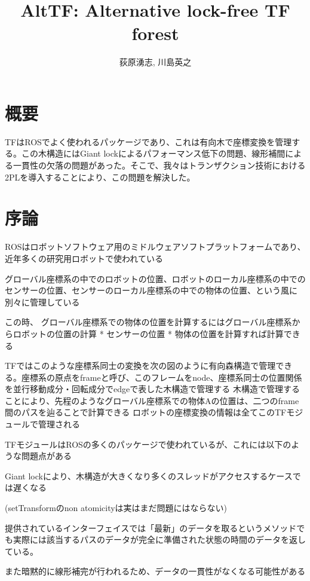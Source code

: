 \documentclass{article}
\title{AltTF: Alternative lock-free TF forest}
\author{荻原湧志, 川島英之}
\begin{document}
\begin{multicols}{2}

\maketitle

\section*{概要}
TFはROSでよく使われるパッケージであり、これは有向木で座標変換を管理する。この木構造にはGiant lockによるパフォーマンス低下の問題、線形補間による一貫性の欠落の問題があった。そこで、我々はトランザクション技術における2PLを導入することにより、この問題を解決した。

\section{序論}


ROSはロボットソフトウェア用のミドルウェアソフトプラットフォームであり、近年多くの研究用ロボットで使われている

グローバル座標系の中でのロボットの位置、ロボットのローカル座標系の中でのセンサーの位置、センサーのローカル座標系の中での物体の位置、という風に別々に管理している

この時、
グローバル座標系での物体の位置を計算するにはグローバル座標系からロボットの位置の計算 * センサーの位置 * 物体の位置を計算すれば計算できる

TFではこのような座標系同士の変換を次の図のように有向森構造で管理できる。座標系の原点をframeと呼び、このフレームをnode、座標系同士の位置関係を並行移動成分・回転成分でedgeで表した木構造で管理する
木構造で管理することにより、先程のようなグローバル座標系での物体Aの位置は、二つのframe間のパスを辿ることで計算できる
ロボットの座標変換の情報は全てこのTFモジュールで管理される

TFモジュールはROSの多くのパッケージで使われているが、これには以下のような問題点がある

Giant lockにより、木構造が大きくなり多くのスレッドがアクセスするケースでは遅くなる

(setTransformのnon atomicityは実はまだ問題にはならない)

提供されているインターフェイスでは「最新」のデータを取るというメソッドでも実際には該当するパスのデータが完全に準備された状態の時間のデータを返している。

また暗黙的に線形補完が行われるため、データの一貫性がなくなる可能性がある






\end{multicols}
\end{document}
